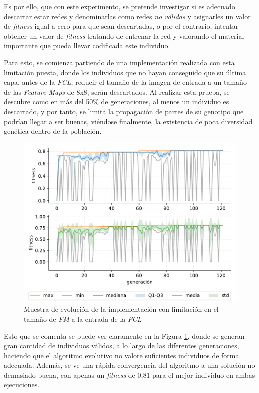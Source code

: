 Es por ello, que con este experimento, se pretende investigar si es adecuado descartar estar redes y denominarlas como redes \textit{no válidas} y asignarles un valor de \textit{fitness} igual a cero para que sean descartadas, o por el contrario, intentar obtener un valor de \textit{fitness} tratando de entrenar la red y valorando el material importante que pueda llevar codificada este individuo.

Para esto, se comienza partiendo de una implementación realizada con esta limitación puesta, donde los individuos que no hayan conseguido que su última capa, antes de la \textit{FCL}, reducir el tamaño de la imagen de entrada a un tamaño de las \textit{Feature Maps} de 8x8, serán descartados. Al realizar esta prueba, se descubre como en más del 50\% de generaciones, al menos un individuo es descartado, y por tanto, se limita la propagación de partes de su genotipo que podrían llegar a ser buenas, viéndose finalmente, la existencia de poca diversidad genética dentro de la población.

\begin{figure}[h]
    \centering
    \includegraphics[width=1\textwidth]{figuras/experimentos/fcl_grande/con_limitacion_1.pdf}
    \caption{Muestra de evolución de la implementación con limitación en el tamaño de \textit{FM} a la entrada de la \textit{FCL}}
    \label{fig:con_limit_fcl}
\end{figure}

Esto que se comenta se puede ver claramente en la Figura \ref{fig:con_limit_fcl}, donde se generan gran cantidad de individuos válidos, a lo largo de las diferentes generaciones, haciendo que el algoritmo evolutivo no valore suficientes individuos de forma adecuada. Además, se ve una rápida convergencia del algoritmo a una solución no demasiado buena, con apenas un \textit{fitness} de 0,81 para el mejor individuo en ambas ejecuciones.

